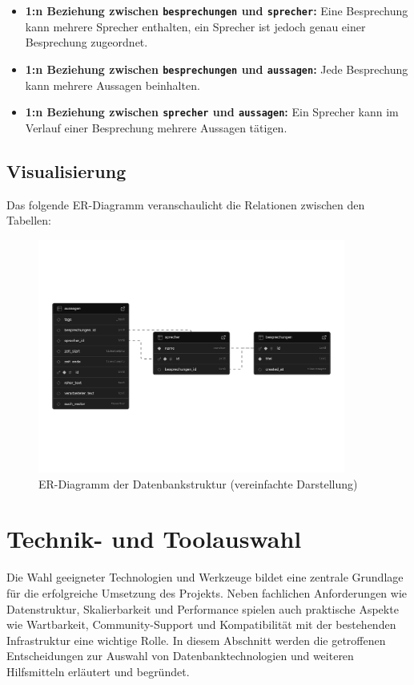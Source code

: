 \begin{itemize}
    \item \textbf{1:n Beziehung zwischen \texttt{besprechungen} und \texttt{sprecher}:}
    Eine Besprechung kann mehrere Sprecher enthalten, ein Sprecher ist jedoch genau einer Besprechung zugeordnet.

    \item \textbf{1:n Beziehung zwischen \texttt{besprechungen} und \texttt{aussagen}:}
    Jede Besprechung kann mehrere Aussagen beinhalten.

    \item \textbf{1:n Beziehung zwischen \texttt{sprecher} und \texttt{aussagen}:}
    Ein Sprecher kann im Verlauf einer Besprechung mehrere Aussagen tätigen.
\end{itemize}

\subsection{Visualisierung}
\label{sec:datenmodell:visualisierung}

Das folgende ER-Diagramm veranschaulicht die Relationen zwischen den Tabellen:

\clearpage 
\begin{figure}[h!]
    \centering
    \includegraphics[width=0.9\textwidth]{Bilder/ERDiagram.png}
    \caption{ER-Diagramm der Datenbankstruktur (vereinfachte Darstellung)}
    \label{fig:er-diagramm}
\end{figure}


\section{Technik- und Toolauswahl}
\label{sec: toolauswahl}
Die Wahl geeigneter Technologien und Werkzeuge bildet eine zentrale Grundlage
für die erfolgreiche Umsetzung des Projekts. Neben fachlichen Anforderungen
wie Datenstruktur, Skalierbarkeit und Performance spielen auch praktische
Aspekte wie Wartbarkeit, Community-Support und Kompatibilität mit der
bestehenden Infrastruktur eine wichtige Rolle. In diesem Abschnitt werden die
getroffenen Entscheidungen zur Auswahl von Datenbanktechnologien und weiteren
Hilfsmitteln erläutert und begründet.

